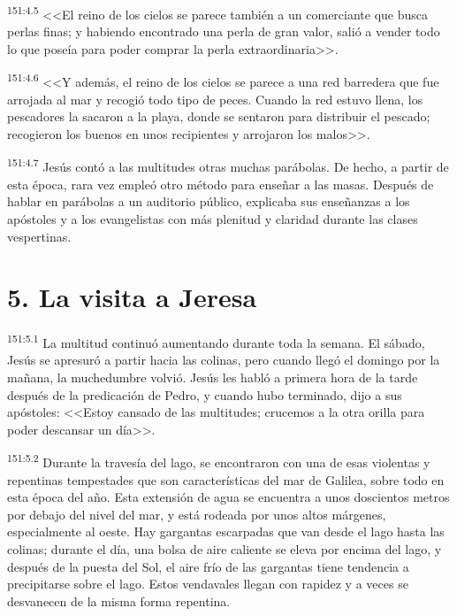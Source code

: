 \par 
\textsuperscript{151:4.5} <<El reino de los cielos se parece también a un comerciante que busca perlas finas; y habiendo encontrado una perla de gran valor, salió a vender todo lo que poseía para poder comprar la perla extraordinaria>>.

\par 
\textsuperscript{151:4.6} <<Y además, el reino de los cielos se parece a una red barredera que fue arrojada al mar y recogió todo tipo de peces. Cuando la red estuvo llena, los pescadores la sacaron a la playa, donde se sentaron para distribuir el pescado; recogieron los buenos en unos recipientes y arrojaron los malos>>.

\par 
\textsuperscript{151:4.7} Jesús contó a las multitudes otras muchas parábolas. De hecho, a partir de esta época, rara vez empleó otro método para enseñar a las masas. Después de hablar en parábolas a un auditorio público, explicaba sus enseñanzas a los apóstoles y a los evangelistas con más plenitud y claridad durante las clases vespertinas.

\section*{5. La visita a Jeresa}
\par 
\textsuperscript{151:5.1} La multitud continuó aumentando durante toda la semana. El sábado, Jesús se apresuró a partir hacia las colinas, pero cuando llegó el domingo por la mañana, la muchedumbre volvió. Jesús les habló a primera hora de la tarde después de la predicación de Pedro, y cuando hubo terminado, dijo a sus apóstoles: <<Estoy cansado de las multitudes; crucemos a la otra orilla para poder descansar un día>>.

\par 
\textsuperscript{151:5.2} Durante la travesía del lago, se encontraron con una de esas violentas y repentinas tempestades que son características del mar de Galilea, sobre todo en esta época del año. Esta extensión de agua se encuentra a unos doscientos metros por debajo del nivel del mar, y está rodeada por unos altos márgenes, especialmente al oeste. Hay gargantas escarpadas que van desde el lago hasta las colinas; durante el día, una bolsa de aire caliente se eleva por encima del lago, y después de la puesta del Sol, el aire frío de las gargantas tiene tendencia a precipitarse sobre el lago. Estos vendavales llegan con rapidez y a veces se desvanecen de la misma forma repentina.

